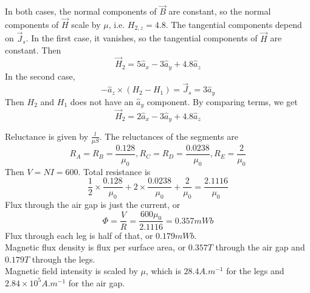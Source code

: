 \documentclass[answers]{exam}
\begin{document}
\begin{questions}

\begin{solution}
    In both cases, the normal components of $\vec B$ are constant, so the normal components of $\vec H$ scale by $\mu$, i.e. $H_{2,z} = 4.8$. The tangential components depend on $\vec J_s$. In the first case, it vanishes, so the tangential components of $\vec H$ are constant. Then
    $$\vec H_2 = 5\hat a_x - 3\hat a_y + 4.8\hat a_z$$
    In the second case,
    $$-\hat a_z \times (H_2 - H_1) = \vec J_s = 3\hat a_y$$
    Then $H_2$ and $H_1$ does not have an $\hat a_y$ component. By comparing terms, we get
    $$\vec H_2 = 2\hat a_x - 3\hat a_y + 4.8 \hat a_z$$
\end{solution}


\begin{solution}
    Reluctance is given by $\frac{l}{\mu S}$. The reluctances of the segments are
    $$R_A = R_B = \frac{0.128}{\mu_0}, R_C = R_D = \frac{0.0238}{\mu_0}, R_E = \frac{2}{\mu_0}$$
    Then $V=NI=600$. Total resistance is
    $$\frac{1}{2} \times \frac{0.128}{\mu_0} + 2 \times \frac{0.0238}{\mu_0} + \frac{2}{\mu_0} = \frac{2.1116}{\mu_0}$$
    Flux through the air gap is just the current, or
    $$\Phi = \frac{V}{R} = \frac{600\mu_0}{2.1116} = 0.357\unit{mWb}$$
    Flux through each leg is half of that, or $0.179\unit{mWb}$. \\
    Magnetic flux density is flux per surface area, or $0.357\unit{T}$ through the air gap and $0.179\unit{T}$ through the legs. \\
    Magnetic field intensity is scaled by $\mu$, which is $28.4\unit{A.m^{-1}}$ for the legs and $2.84\times10^5\unit{A.m^{-1}}$ for the air gap.
\end{solution}


\end{questions}
\end{document}
